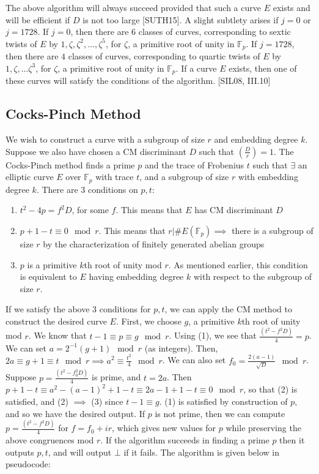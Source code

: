 \documentclass[12pt,twoside]{article}
\newcommand{\legendre}[2]{\genfrac{(}{)}{}{}{#1}{#2}}
\begin{document}
 
 
 
 
 
 
\noindent The above algorithm will always succeed provided that such a curve $E$ exists and will be efficient if $D$ is not too large [SUTH15]. A slight subtlety arises if $j = 0$ or $j = 1728$. If $j = 0$, then there are $6$ classes of curves, corresponding to sextic twists of $E$ by $1, \zeta, \zeta^2, \dots, \zeta^5$, for $\zeta$, a primitive root of unity in $\mathbb F_p$. If $j = 1728$, then there are $4$ classes of curves, corresponding to quartic twists of $E$ by $1, \zeta, \dots \zeta^3$, for $\zeta$, a primitive root of unity in $\mathbb F_p$. If a curve $E$ exists, then one of these curves will satisfy the conditions of the algorithm. [SIL08, III.10]
\subsection{Cocks-Pinch Method}

We wish to construct a curve with a subgroup of size $r$ and embedding degree $k$. Suppose we also have chosen a CM discriminant $D$ such that $\legendre{D}{r} = 1$. The Cocks-Pinch method finds a prime $p$ and the trace of Frobenius $t$ such that $\exists$ an elliptic curve $E$ over $\mathbb F_p$ with trace $t$, and a subgroup of size $r$ with embedding degree $k$. There are $3$ conditions on $p,t$:
\begin{enumerate}
\item $t^2-4p = f^2 D$, for some $f$. This means that $E$ has CM discriminant $D$
\item $p+1-t \equiv 0 \mod r$. This means that $r \Big | \#E(\mathbb F_p) \implies $ there is a subgroup of size $r$ by the characterization of finitely generated abelian groups
\item $p$ is a primitive $k$th root of unity mod $r$. As mentioned earlier, this condition is equivalent to $E$ having embedding degree $k$ with respect to the subgroup of size $r$.

\end{enumerate}
If we satisfy the above $3$ conditions for $p,t$, we can apply the CM method to construct the desired curve $E$. First, we choose $g$, a primitive $k$th root of unity mod $r$. We know that $t-1 \equiv p \equiv g \mod r$. Using (1), we see that $\frac{(t^2 - f^2 D)}{4} = p$. We can set $a= 2^{-1} (g+1) \mod r$ (as integers). Then, $2 a \equiv g+1 \equiv t \mod r \implies a^2 \equiv \frac{t^2}{4} \mod r$. We can also set $f_0 = \frac{2(a-1)}{\sqrt D} \mod r$. Suppose $p = \frac{(t^2 - f^2_0 D)}{4}$ is prime, and $t = 2a$. Then $p+1 - t \equiv a^2 - (a-1)^2 + 1 - t \equiv 2a -1 + 1 - t \equiv 0 \mod r$, so that (2) is satisfied, and (2) $\implies$ (3) since $t-1 \equiv g$. (1) is satisfied by construction of $p$, and so we have the desired output. If $p$ is not prime, then we can compute $p = \frac{(t^2 - f^2 D)}{4}$ for $f = f_0 + ir$, which gives new values for $p$ while preserving the above congruences mod $r$. If the algorithm succeeds in finding a prime $p$ then it outputs $p,t$, and will output $\bot$ if it fails. The algorithm is given below in pseudocode:
 
\end{document}
